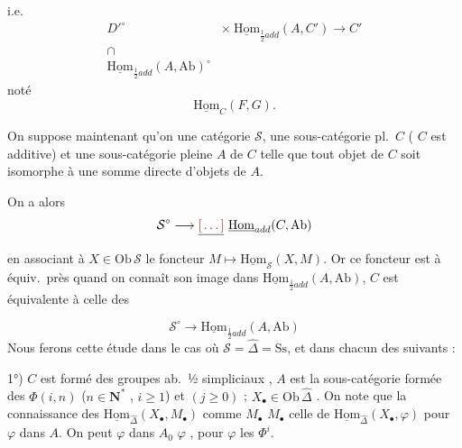 \documentclass[11pt,a4paper]{article}
\begin{document}
i.e.
\[
\begin{array}{cl}
D'^{\circ} & \times\ \underline{\mathrm{Hom}}_{\frac{1}{2}add}(A, C') \longrightarrow C' \\
\cap & \\
\underline{\mathrm{Hom}}_{\frac{1}{2}add}(A, \mathrm{Ab})^{\circ} &
\end{array}
\]
noté
\[
\underline{\mathrm{Hom}}_{C}(F, G) .
\]

On suppose maintenant qu'on  une catégorie $\mathcal{S}$, une sous-catégorie pl.\ $C$  ( $C$ est additive) et une sous-catégorie pleine
$A$ de $C$ telle que tout objet de $C$ soit isomorphe  à une somme
directe  d'objets de $A$.

On a alors \struck{\ill{}}
\[
\mathcal{S}^{\circ} \longrightarrow \struck{\ill{}}\ \underline{\mathrm{Hom}}_{add}(C, \mathrm{Ab})
\]
\struck{\ill{}} en associant à $X \in \mathrm{Ob}\,\mathcal{S}$ le foncteur
$M \longmapsto \underline{\mathrm{Hom}}_{\mathcal{S}}(X, M)$.
Or ce foncteur est  à équiv.\ près quand on connaît son image dans
$\underline{\mathrm{Hom}}_{\frac{1}{2}add}(A, \mathrm{Ab})$,   \ill{}
$C$ est équivalente à celle des

\[
\mathcal{S}^{\circ} \longrightarrow \underline{\mathrm{Hom}}_{\frac{1}{2}add}(A, \mathrm{Ab})
\]
Nous ferons cette étude dans le cas où $\mathcal{S} = \widehat{\Delta} = \mathrm{Ss}$, et dans chacun des
 suivants \struck{\ill{} \ill{}} :

1°) $C$ est formé des groupes
ab.\ ½ simpliciaux  \struck{\ill{}}, $A$ est la sous-catégorie formée des
$\Phi(i,n)$ ($n \in \mathbf{N}^{*}$ \struck{\ill{}}, $i \geq 1$) et 
$(j \geq 0)$ ;
 $X_{\bullet} \in \mathrm{Ob}\,\widehat{\Delta}$ . On note que la
connaissance des $\underline{\mathrm{Hom}}_{\widehat{\Delta}}(X_{\bullet}, M_{\bullet})$ comme
  $M_{\bullet}$  \ill{} 
$M_{\bullet}$ \ill{}  celle de $\underline{\mathrm{Hom}}_{\widehat{\Delta}}(X_{\bullet}, \varphi)$ pour
$\varphi$ dans $A$. On peut  \ill{} $\varphi$ dans $A_0$  
\struck{\ill{}} $\varphi$ \ill{} \ill{} \ill{},  \ill{} pour $\varphi$ 
les $\Phi^{i}$.
\end{document}
